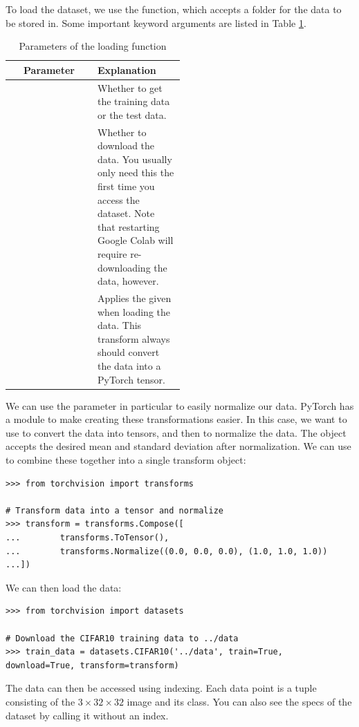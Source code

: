 To load the dataset, we use the  function, which accepts a folder for the data to be stored in.
Some important keyword arguments are listed in Table \ref{table:deeplearning:download_data}.
\begin{table}[H]
	\centering
	\begin{tabular}{c|p{0.5\linewidth}}
	Parameter & Explanation \\
	\hline
	\li{train} & Whether to get the training data or the test data.\\
	\li{download} & Whether to download the data.
	You usually only need this the first time you access the dataset.
	Note that restarting Google Colab will require re-downloading the data, however.\\
	\li{transform} & Applies the given \li{transform} when loading the data.
	This transform always should convert the data into a PyTorch tensor.
	\end{tabular}
	\caption{Parameters of the  loading function}\label{table:deeplearning:download_data}
\end{table}
We can use the  parameter in particular to easily normalize our data.
PyTorch has a module  to make creating these transformations easier.
In this case, we want to use  to convert the data into tensors, and then  to normalize the data.
The  object accepts the desired mean and standard deviation after normalization.
We can use  to combine these together into a single transform object:
\begin{lstlisting}
>>> from torchvision import transforms

# Transform data into a tensor and normalize
>>> transform = transforms.Compose([
...        transforms.ToTensor(),
...        transforms.Normalize((0.0, 0.0, 0.0), (1.0, 1.0, 1.0))
...])
\end{lstlisting}
We can then load the data:
\begin{lstlisting}
>>> from torchvision import datasets

# Download the CIFAR10 training data to ../data
>>> train_data = datasets.CIFAR10('../data', train=True, download=True, transform=transform)
\end{lstlisting}
The data can then be accessed using indexing. 
Each data point is a tuple consisting of the $3\times32\times32$ image and its class.
You can also see the specs of the dataset by calling it without an index.

